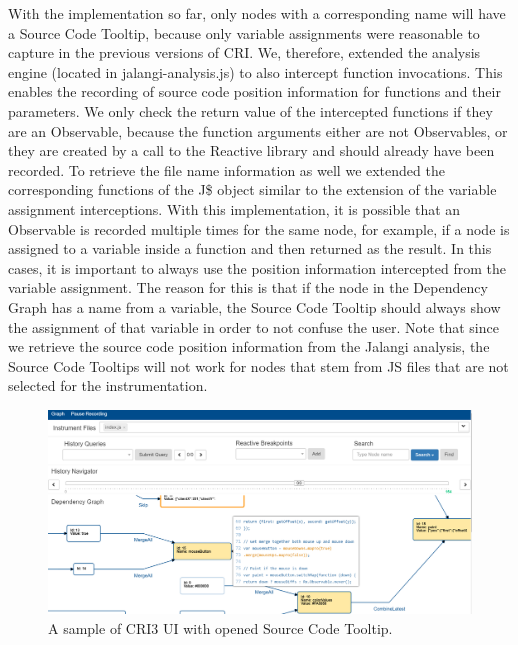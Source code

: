 With the implementation so far, only nodes with a corresponding name will have a Source Code Tooltip, because only variable assignments were reasonable to capture in the previous versions of CRI. We, therefore, extended the analysis engine (located in jalangi-analysis.js) to also intercept function invocations. This enables the recording of source code position information for functions and their parameters. We only check the return value of the intercepted functions if they are an Observable, because the function arguments either are not Observables, or they are created by a call to the Reactive library and should already have been recorded. To retrieve the file name information as well we extended the corresponding functions of the J\$ object similar to the extension of the variable assignment interceptions. With this implementation, it is possible that an Observable is recorded multiple times for the same node, for example, if a node is assigned to a variable inside a function and then returned as the result. In this cases, it is important to always use the position information intercepted from the variable assignment. The reason for this is that if the node in the Dependency Graph has a name from a variable, the Source Code Tooltip should always show the assignment of that variable in order to not confuse the user. Note that since we retrieve the source code position information from the Jalangi analysis, the Source Code Tooltips will not work for nodes that stem from JS files that are not selected for the instrumentation.\\

\begin{figure}[!h]
	\centering
	\includegraphics[scale=0.5,trim=0 0 0 0]{gfx/CRI-sampleView.png}
	\caption{A sample of CRI3 UI with opened Source Code Tooltip.}
	\label{fig:CRI}
\end{figure}


